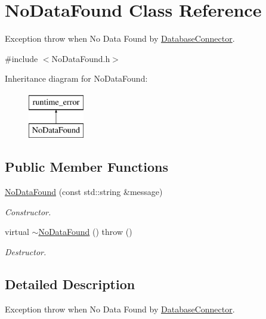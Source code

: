 \hypertarget{class_no_data_found}{\section{No\-Data\-Found Class Reference}
\label{class_no_data_found}
}


Exception throw when No Data Found by \hyperlink{class_database_connector}{Database\-Connector}.  




{\ttfamily \#include $<$No\-Data\-Found.\-h$>$}

Inheritance diagram for No\-Data\-Found\-:\begin{figure}[H]
\begin{center}
\leavevmode
\includegraphics[height=2.000000cm]{class_no_data_found}
\end{center}
\end{figure}
\subsection*{Public Member Functions}
\begin{DoxyCompactItemize}
\item 
\hyperlink{class_no_data_found_ad263176700b4df113b134835882d66e9}{No\-Data\-Found} (const std\-::string \&message)
\begin{DoxyCompactList}\small\item\em Constructor. \end{DoxyCompactList}\item 
\hypertarget{class_no_data_found_af4e17a25274afdb2f6ed17f20d1372fb}{virtual \hyperlink{class_no_data_found_af4e17a25274afdb2f6ed17f20d1372fb}{$\sim$\-No\-Data\-Found} ()  throw ()}\label{class_no_data_found_af4e17a25274afdb2f6ed17f20d1372fb}

\begin{DoxyCompactList}\small\item\em Destructor. \end{DoxyCompactList}\end{DoxyCompactItemize}


\subsection{Detailed Description}
Exception throw when No Data Found by \hyperlink{class_database_connector}{Database\-Connector}. 

